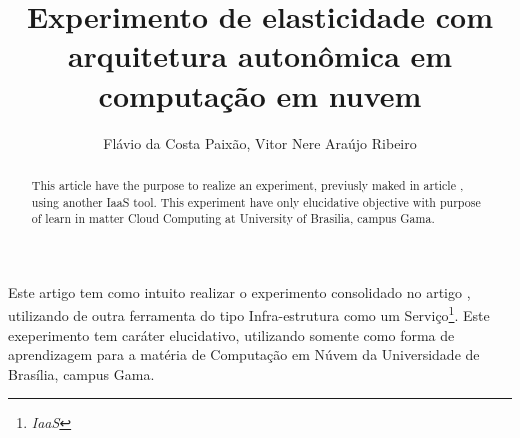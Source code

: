 \documentclass[12pt]{article}
\title{Experimento de elasticidade com arquitetura autonômica em computação em nuvem}
\author{Flávio da Costa Paixão\inst{1}, Vitor Nere Araújo Ribeiro\inst{1}}
\begin{document}
\maketitle

\begin{abstract}
  This article have the purpose to realize an experiment, previusly maked in article \cite{coutinho_et_al:14}, using another IaaS tool. This experiment have only elucidative objective with purpose of learn in matter Cloud Computing at University of Brasilia, campus Gama.
\end{abstract}

\begin{resumo}
  Este artigo tem como intuito realizar o experimento consolidado no artigo \cite{coutinho_et_al:14}, utilizando de outra ferramenta do tipo Infra-estrutura como um Serviço\footnote{\textit{IaaS}}. Este exeperimento tem caráter elucidativo, utilizando somente como forma de aprendizagem para a matéria de Computação em Núvem da Universidade de Brasília, campus Gama.

\end{resumo}







\end{document}
